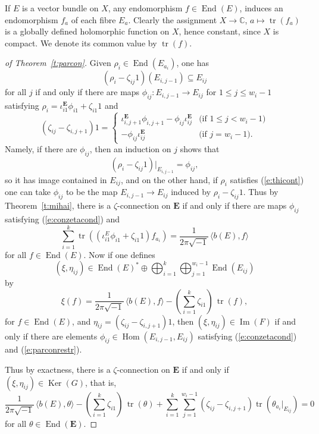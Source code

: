 \documentclass{amsart}
\theoremstyle{plain}
\theoremstyle{definition}
\theoremstyle{remark}
\newcommand{\C}{\mathbb{C}}
\DeclareMathOperator{\tr}{tr}
\DeclareMathOperator{\Hom}{Hom}
\DeclareMathOperator{\Ker}{Ker}
\DeclareMathOperator{\Ima}{Im}
\DeclareMathOperator{\End}{End}
\newcommand{\E}{\mathbf{E}}
\begin{document}
If $E$ is a vector bundle on $X$, any endomorphism $f\in\End(E)$, induces
an endomorphism $f_a$ of each fibre $E_a$. Clearly the assignment $X\to \C$,
$a\mapsto \tr(f_a)$ is a globally defined holomorphic function on $X$,
hence constant, since $X$ is compact. We denote its common value by $\tr(f)$.


\begin{proof}[of Theorem~\ref{t:parcon}]
Given $\rho_i\in\End(E_{a_i})$, one has
%
\begin{equation}
\label{e:thicont}
(\rho_i - \zeta_{ij} 1)(E_{i,j-1}) \subseteq E_{ij}
\end{equation}
%
for all $j$ if and only if there are maps $\phi_{ij}:E_{i,j-1}\to E_{ij}$
for $1\le j\le w_i-1$ satisfying $\rho_i = \iota^\E_{i1} \phi_{i1} + \zeta_{i1}1$
and
%
\begin{equation}
\label{e:conzetacond}
(\zeta_{ij}-\zeta_{i,j+1}) 1 = \begin{cases}
\iota^\E_{i,j+1} \phi_{i,j+1} - \phi_{ij} \iota^\E_{ij}
& \text{(if $1\le j< w_i-1$)}
\\
- \phi_{ij} \iota^\E_{ij}
& \text{(if $j=w_i-1$).}
\end{cases}
\end{equation}
%
Namely, if there are $\phi_{ij}$, then an induction on $j$ shows that
\[
(\rho_i - \zeta_{ij}1)|_{E_{i,j-1}} = \phi_{ij},
\]
so it has image contained in $E_{ij}$, and on the other hand,
if $\rho_i$ satisfies (\ref{e:thicont}) one can take $\phi_{ij}$ to be the
map $E_{i,j-1} \to E_{ij}$ induced by $\rho_i - \zeta_{ij} 1$.
Thus by Theorem~\ref{t:mihai}, there is a $\zeta$-connection on $\E$ if and only if there
are maps $\phi_{ij}$ satisfying (\ref{e:conzetacond}) and
%
\begin{equation}
\label{e:parconrestr}
\sum_{i=1}^k \tr\left( (\iota^E_{i1}\phi_{i1} + \zeta_{i1} 1) f_{a_i}\right) =
\frac{1}{2\pi\sqrt{-1}} \, \langle b(E),f\rangle
\end{equation}
%
for all $f\in\End(E)$. Now if one defines
\[
(\xi,\eta_{ij})\in \End(E)^* \oplus \bigoplus_{i=1}^k \bigoplus_{j=1}^{w_i-1} \End(E_{ij})
\]
by
\[
\xi(f) = \frac{1}{2\pi\sqrt{-1}} \, \langle b(E),f\rangle - (\sum_{i=1}^k \zeta_{i1}) \, \tr(f),
\]
for $f\in\End(E)$, and $\eta_{ij} = (\zeta_{ij}-\zeta_{i,j+1}) 1$,
then $(\xi,\eta_{ij})\in\Ima(F)$ if and only if there are elements
$\phi_{ij}\in\Hom(E_{i,j-1},E_{ij})$ satisfying
(\ref{e:conzetacond}) and (\ref{e:parconrestr}).

Thus by exactness, there is a $\zeta$-connection on $\E$
if and only if $(\xi,\eta_{ij})\in\Ker(G)$, that is,
%
\begin{equation}
\label{e:zetaconcond}
\frac{1}{2\pi\sqrt{-1}} \, \langle b(E),\theta\rangle
- (\sum_{i=1}^k \zeta_{i1}) \, \tr(\theta)
+ \sum_{i=1}^k \sum_{j=1}^{w_i-1} (\zeta_{ij}-\zeta_{i,j+1}) \tr( \theta_{a_i}|_{E_{ij}} )
= 0
\end{equation}
%
for all $\theta\in\End(\E)$.


\end{proof}
\end{document}
